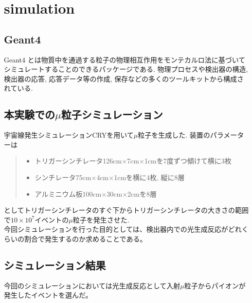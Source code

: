 \chapter{simulation}\label{simulation}
\section{Geant4}
Geant4 とは物質中を通過する粒子の物理相互作用をモンテカルロ法に基づいてシミュレートすることのできるパッケージである.
物理プロセスや検出器の構造, 検出器の応答, 応答データ等の作成, 保存などの多くのツールキットから構成されている.

\section{本実験での$\mu$粒子シミュレーション}
宇宙線発生シミュレーションCRYを用いて$\mu$粒子を生成した.
装置のパラメーターは
    \begin{quote}
        \begin{itemize}
            \item トリガーシンチレータ126cm$\times$7cm$\times$1cmを7度ずつ傾けて横に3枚
            \item シンチレータ75cm$\times$4cm$\times$1cmを横に4枚, 縦に8層
            \item アルミニウム板100cm$\times$30cm$\times$2cmを8層
        \end{itemize}
    \end{quote}
としてトリガーシンチレータのすぐ下からトリガーシンチレータの大きさの範囲で$10 \times10^{7}$イベントの$\mu$粒子を発生させた.
\\
今回シミュレーションを行った目的としては、検出器内での光生成反応がどれくらいの割合で発生するのか求めることである。

\section{シミュレーション結果}
今回のシミュレーションにおいては光生成反応として入射$\mu$粒子からパイオンが発生したイベントを選んだ。

